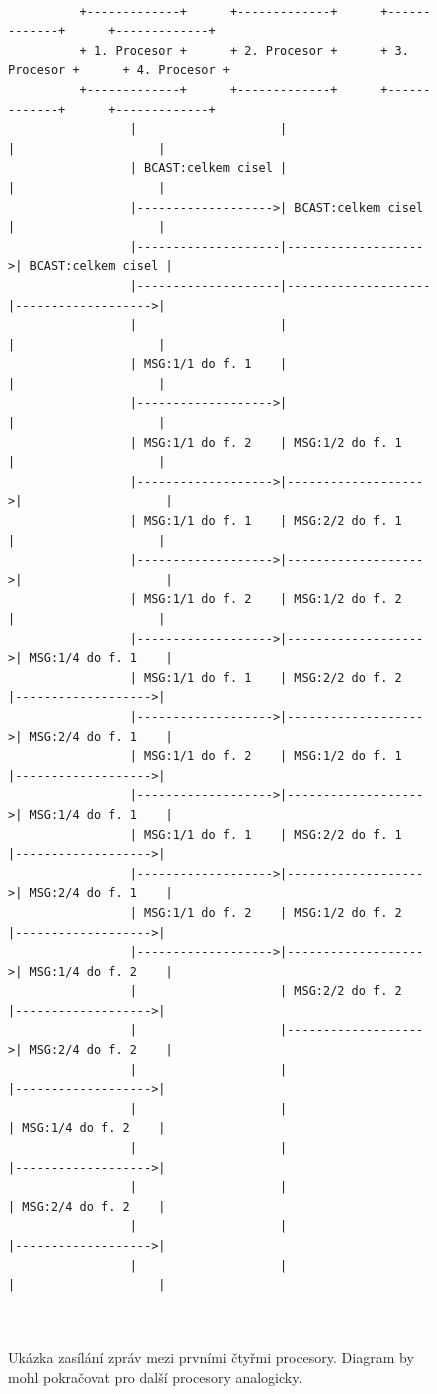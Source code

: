 \documentclass[a4paper, 10pt]{article}[5.10.2011]
\begin{document}
\begin{figure}[ht]
\centering
\small\begin{verbatim}
          
          +-------------+      +-------------+      +-------------+      +-------------+
          + 1. Procesor +      + 2. Procesor +      + 3. Procesor +      + 4. Procesor +
          +-------------+      +-------------+      +-------------+      +-------------+
                 |                    |                    |                    |
                 | BCAST:celkem cisel |                    |                    |
                 |------------------->| BCAST:celkem cisel |                    |
                 |--------------------|------------------->| BCAST:celkem cisel |
                 |--------------------|--------------------|------------------->|
                 |                    |                    |                    |
                 | MSG:1/1 do f. 1    |                    |                    |
                 |------------------->|                    |                    |
                 | MSG:1/1 do f. 2    | MSG:1/2 do f. 1    |                    |
                 |------------------->|------------------->|                    |
                 | MSG:1/1 do f. 1    | MSG:2/2 do f. 1    |                    |
                 |------------------->|------------------->|                    |
                 | MSG:1/1 do f. 2    | MSG:1/2 do f. 2    |                    |
                 |------------------->|------------------->| MSG:1/4 do f. 1    |
                 | MSG:1/1 do f. 1    | MSG:2/2 do f. 2    |------------------->|
                 |------------------->|------------------->| MSG:2/4 do f. 1    |
                 | MSG:1/1 do f. 2    | MSG:1/2 do f. 1    |------------------->|
                 |------------------->|------------------->| MSG:1/4 do f. 1    |
                 | MSG:1/1 do f. 1    | MSG:2/2 do f. 1    |------------------->|
                 |------------------->|------------------->| MSG:2/4 do f. 1    |
                 | MSG:1/1 do f. 2    | MSG:1/2 do f. 2    |------------------->|
                 |------------------->|------------------->| MSG:1/4 do f. 2    |
                 |                    | MSG:2/2 do f. 2    |------------------->|
                 |                    |------------------->| MSG:2/4 do f. 2    |
                 |                    |                    |------------------->|
                 |                    |                    | MSG:1/4 do f. 2    |
                 |                    |                    |------------------->|
                 |                    |                    | MSG:2/4 do f. 2    |
                 |                    |                    |------------------->|
                 |                    |                    |                    |
          
          
\end{verbatim}
\caption{Ukázka zasílání zpráv mezi prvními čtyřmi procesory. Diagram by mohl pokračovat pro další procesory analogicky.}
\label{pic}
\end{figure}

\normalsize
\end{document}

